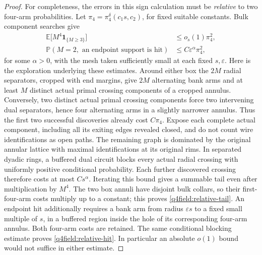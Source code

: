 \begin{proof}
For completeness, the errors in this sign calculation must be
\emph{relative} to two four-arm probabilities.  Let
$\pi_4=\pi_4^\delta(c_1s,c_2)$, for fixed suitable constants.  Bulk
component searches give
\begin{align}
 \mathbb E\bigl[M^4\mathbf1_{\{M\ge3\}}\bigr]
   &\le o_s(1)\pi_4^2,\label{q4field:relative-tail}\\
 \mathbb P(M=2,\text{ an endpoint support is hit})
   &\le C\varepsilon^\alpha\pi_4^2,\label{q4field:relative-hit}
\end{align}
for some $\alpha>0$, with the mesh taken sufficiently small at each
fixed $s,\varepsilon$.  Here is the exploration underlying these
estimates.  Around either box the $2M$ radial separators, cropped with
end margins, give $2M$ alternating bank arms and at least $M$ distinct
actual primal crossing components of a cropped annulus.  Conversely,
two distinct actual primal crossing components force two intervening
dual separators, hence four alternating arms in a slightly narrower
annulus.  Thus the first two successful discoveries already cost
$C\pi_4$.  Expose each complete actual component, including all its
exiting edges revealed closed, and do not count wire identifications
as open paths.  The remaining graph is dominated by
the original annular lattice with maximal identifications at its
original rims.  In separated dyadic rings, a buffered dual circuit
blocks every actual radial crossing with uniformly positive
conditional probability.  Each further discovered crossing therefore
costs at most $Cs^\alpha$.  Iterating this bound gives a summable tail
even after multiplication by $M^4$.  The two box annuli have disjoint
bulk collars, so their first-four-arm costs multiply up to a constant;
this proves \eqref{q4field:relative-tail}.  An endpoint hit additionally
requires a bank arm from radius $\varepsilon s$ to a fixed small
multiple of $s$, in a buffered region inside the hole of its
corresponding four-arm annulus.  Both four-arm costs are retained.
The same conditional blocking estimate proves
\eqref{q4field:relative-hit}.  In particular an absolute $o(1)$ bound
would not suffice in either estimate.


\end{proof}
